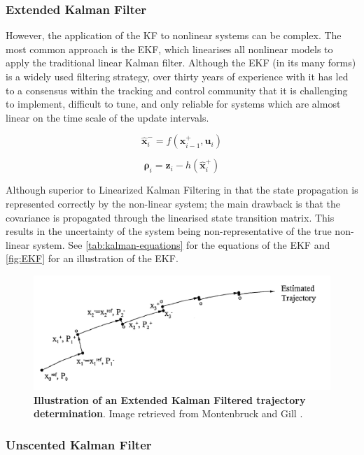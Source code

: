 \subsubsection{Extended Kalman Filter}

However, the application of the KF to nonlinear systems can be complex. The most common approach is the \gls{EKF}, which linearises all nonlinear models to apply the traditional linear Kalman filter. Although the EKF (in its many forms) is a widely used filtering strategy, over thirty years of experience with it has led to a consensus within the tracking and control community that it is challenging to implement, difficult to tune, and only reliable for systems which are almost linear on the time scale of the update intervals.

\begin{equation}
   \hat{\bm{x}}_{i}^- = f({\bm{x}}_{i-1}^+,\bm{u}_{i})
\end{equation}

\begin{equation}
   \bm{\rho}_i = \bm{z}_i - h(\hat{\bm{x}}_{i}^+)
\end{equation}

Although superior to Linearized Kalman Filtering in that the state propagation
is represented correctly by the non-linear system; the main drawback is that the
covariance is propagated through the linearised state transition matrix. This
results in the uncertainty of the system being non-representative of the true
non-linear system. See \autoref{tab:kalman-equations} for the equations of the \gls{EKF} and \autoref{fig:EKF} for an illustration of the \gls{EKF}.

\begin{figure}[htp]
    \centering
    \includegraphics[width=0.8\linewidth]{graphics/ekf.PNG}
    \caption{\textbf{Illustration of an Extended Kalman Filtered trajectory determination}. Image retrieved from Montenbruck and Gill \cite{Montenbruck2000}.}
    \label{fig:EKF}
\end{figure}

\subsubsection{Unscented Kalman Filter}

